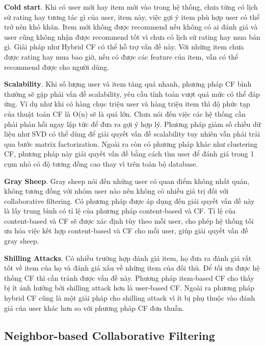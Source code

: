 \textbf{Cold start}. Khi có user mới hay item mới vào trong hệ thống, chưa từng có lịch sử rating hay tương tác gì của user, item này, việc gợi ý item phù hợp user có thể trở nên khó khăn. Item mới không được recommend nếu không có ai đánh giá và user cũng không nhận được recommend tốt vì chưa có lịch sử rating hay mua bán gì. Giải pháp như Hybrid CF có thể hỗ trợ vấn đề này. Với những item chưa được rating hay mua bao giờ, nếu có được các feature của item, vẫn có thể recommend được cho người dùng. 

\textbf{Scalability}. Khi số lượng user và item tăng quá nhanh, phương pháp CF bình thường sẽ gặp phải vấn đề scalability, yêu cầu tính toán vượt quá mức có thể đáp ứng. Ví dụ như khi có hàng chục triệu user và hàng triệu item thì độ phức tạp của thuật toán CF là O(n) sẽ là quá lớn. Chưa nói đến việc các hệ thống cần phải phản hồi ngay lập tức để đưa ra gợi ý hợp lý. Phương pháp giảm số chiều dữ liệu như SVD có thể dùng để giải quyết vấn đề scalability tuy nhiên vẫn phải trải qua bước matrix factorization. Ngoài ra còn có phương pháp khác như clustering CF, phương pháp này giải quyết vấn đề bằng cách tìm user để đánh giá trong 1 cụm nhỏ có độ tương đồng cao thay vì trên toàn bộ database. 

\textbf{Gray Sheep}. Gray sheep nói đến những user có quan điểm không nhất quán, không tương đồng với nhóm user nào nên không có nhiều giá trị đối với collaborative filtering. Có phương pháp được áp dụng đến giải quyết vấn đề này là lấy trung bình có tỉ lệ của phương pháp content-based và CF. Tỉ lệ của content-based và CF sẽ được xác định tùy theo mỗi user, cho phép hệ thống tối ưu hóa việc kết hợp content-based và CF cho mỗi user, giúp giải quyết vấn đề gray sheep.

\textbf{Shilling Attacks}. Có nhiều trường hợp đánh giá item, họ đưa ra đánh giá rất tốt về item của họ và đánh giá xấu về những item của đối thủ. Để tối ưu được hệ thống CF thì cần tránh được vấn đề này. Phương pháp item-based CF cho thấy bị ít ảnh hưởng bởi shilling attack hơn là user-based CF. Ngoài ra phương pháp hybrid CF cũng là một giải pháp cho shilling attack vì ít bị phụ thuộc vào đánh giá của user khác hơn so với phương pháp CF đơn thuần.

\subsection{Neighbor-based Collaborative Filtering}
